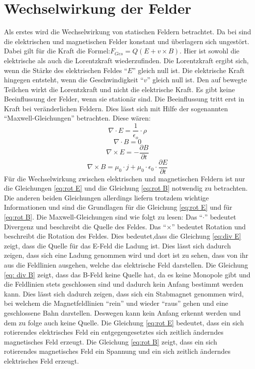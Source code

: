 \section{Wechselwirkung der Felder}%
\label{sec:Maxwell}
Als erstes wird die Wechselwirkung von statischen Feldern betrachtet.
Da bei sind die elektrischen und magnetischen Felder konstant und überlagern sich ungestört.
Dabei gilt für die Kraft die Formel:$F_{Ges} = Q (E + v \times B)$.
Hier ist sowohl die elektrische als auch die Lorentzkraft wiederzufinden.
Die Lorentzkraft ergibt sich, wenn die Stärke des elektrischen Feldes "`$E$"' gleich null ist.
Die elektrische Kraft hingegen entsteht, wenn die Geschwindigkeit "`$v$"' gleich null ist.
Den auf bewegte Teilchen wirkt die Lorentzkraft und nicht die elektrische Kraft.
Es gibt keine Beeinflussung der Felder, wenn sie stationär sind. 
Die Beeinflussung tritt erst in Kraft bei veränderlichen Feldern.
Dies lässt sich mit Hilfe der sogenannten "`Maxwell-Gleichungen"' betrachten.
Diese wären:
\begin{equation}
\label{eq:div E}
    \nabla \cdot E = \frac{1}{\epsilon_o} \cdot \rho
\end{equation}
\begin{equation}
\label{eq: div B}
    \nabla \cdot B = 0
\end{equation}
\begin{equation}
\label{eq:rot E}
    \nabla \times E = - \frac{\partial B}{\partial t}
\end{equation}
\begin{equation}
\label{eq:rot B}
    \nabla \times B = \mu_0 \cdot j + \mu_0 \cdot \epsilon_0 \cdot \frac{\partial E}{\partial t}
\end{equation}
Für die Wechselwirkung zwischen elektrischen und magnetischen Feldern ist nur die Gleichungen \ref{eq:rot E} und die Gleichung \ref{eq:rot B} notwendig zu betrachten.
Die anderen beiden Gleichungen allerdings liefern trotzdem wichtige Informationen und sind die Grundlagen für die Gleichung \ref{eq:rot E} und für \ref{eq:rot B}.
Die Maxwell-Gleichungen sind wie folgt zu lesen: 
Das "`$\cdot$"' bedeutet Divergenz und beschreibt die Quelle des Feldes.
Das "`$\times$"' bedeutet Rotation und beschreibt die Rotation des Feldes.
Dies bedeutet,dass die Gleichung \ref{eq:div E} zeigt, dass die Quelle für das E-Feld die Ladung ist.
Dies lässt sich dadurch zeigen, dass sich eine Ladung genommen wird und dort ist zu sehen, dass von ihr aus die Feldlinien ausgehen, welche das elektrische Feld darstellen.
Die Gleichung \ref{eq: div B} zeigt, dass das B-Feld keine Quelle hat, da es keine Monopole gibt und die Feldlinien stets geschlossen sind und dadurch kein Anfang bestimmt werden kann.
Dies lässt sich dadurch zeigen, dass sich ein Stabmagnet genommen wird, bei welchem die Magnetfeldlinien "`rein"' und wieder "`raus"' gehen und eine geschlossene Bahn darstellen.
Deswegen kann kein Anfang erkennt werden und dem zu folge auch keine Quelle.
Die Gleichung \ref{eq:rot E} bedeutet, dass ein sich rotierendes elektrisches Feld ein entgegengesetztes sich zeitlich änderndes magnetisches Feld erzeugt.
Die Gleichung \ref{eq:rot B} zeigt, dass ein sich rotierendes magnetisches Feld ein Spannung und ein sich zeitlich änderndes elektrisches Feld erzeugt.
